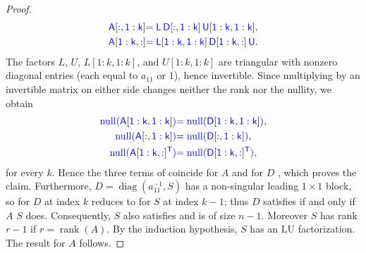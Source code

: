 \documentclass[10pt,twoside]{siamart1116}
\DeclareMathOperator{\rk}{rank}
\DeclareMathOperator{\nl}{null}
\numberwithin{theorem}{section}
\providecommand{\DIFadd}[1]{{\protect\color{blue} \sf #1}} %
\providecommand{\DIFdel}[1]{{\protect\color{red} \scriptsize #1}} %
\providecommand{\DIFaddbegin}{} %
\providecommand{\DIFaddend}{} %
\providecommand{\DIFdelbegin}{} %
\providecommand{\DIFdelend}{} %
\begin{document}
\begin{proof}
\begin{align*}
    \DIFadd{A}[\DIFadd{:,1:k}]   & \DIFadd{= L\, D}[\DIFadd{:,1:k}]\DIFadd{\, U}[\DIFadd{1:k,1:k}]\DIFadd{,            }\\
    \DIFadd{A}[\DIFadd{1:k,:}]   & \DIFadd{= L}[\DIFadd{1:k,1:k}]\DIFadd{\, D}[\DIFadd{1:k,:}]\DIFadd{\, U.
  }\end{align*}
  \DIFadd{The factors $L$}\DIFaddend , \DIFaddbegin \DIFadd{$U$, $L[1:k,1:k]$, and $U[1:k,1:k]$ are triangular with nonzero diagonal entries (each equal to $a_{11}$ or $1$), hence invertible. Since multiplying by an invertible matrix on either side changes neither the rank nor the nullity, we obtain
  }\begin{align*}
    \DIFadd{\nl(A}[\DIFadd{1:k,1:k}]\DIFadd{)   }& \DIFadd{= \nl(D}[\DIFadd{1:k,1:k}]\DIFadd{),  }\\
    \DIFadd{\nl(A}[\DIFadd{:,1:k}]\DIFadd{)     }& \DIFadd{= \nl(D}[\DIFadd{:,1:k}]\DIFadd{),     }\\
    \DIFadd{\nl(}{\DIFadd{A}[\DIFadd{1:k,:}]}\DIFadd{^T) }& \DIFadd{= \nl(}{\DIFadd{D}[\DIFadd{1:k,:}]}\DIFadd{^T),
  }\end{align*}
  \DIFadd{for every $k$. Hence the three terms of } \DIFadd{coincide for $A$ and for }\DIFaddend $D$\DIFaddbegin \DIFadd{, which proves the claim. Furthermore, $D = \operatorname{diag}(a_{11}^{-1}, S)$ has a non-singular leading $1 \times 1$ block, so } \DIFadd{for $D$ at index $k$ reduces to } \DIFadd{for $S$ at index $k-1$; thus $D$ }\DIFaddend satisfies  if and only if \DIFdelbegin \DIFdel{$A$ }\DIFdelend \DIFaddbegin \DIFadd{$S$ }\DIFaddend does. Consequently, $S$ \DIFdelbegin \DIFdel{also }\DIFdelend satisfies  and is of size $n-1$. Moreover $S$ has rank $r-1$ if $r = \rk(A)$. By the induction hypothesis, $S$ has an LU factorization. The result for $A$ follows.


\end{proof}
\end{document}
